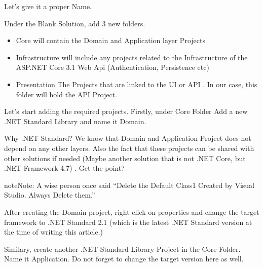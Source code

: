 \documentclass[letterpaper,10pt,english]{sphinxmanual}
\begin{document}
\noindent{}

Let’s give it a proper Name.

\noindent{}

Under the Blank Solution, add 3 new folders.
\begin{itemize}
\item {} 
Core \textendash{} will contain the Domain and Application layer Projects

\item {} 
Infrastructure \textendash{} will include any projects related to the Infrastructure of the ASP.NET Core 3.1 Web Api (Authentication, Persistence etc)

\item {} 
Presentation \textendash{} The Projects that are linked to the UI or API . In our case, this folder will hold the API Project.

\end{itemize}

\noindent{}

Let’s start adding the required projects. Firstly, under Core Folder Add a new .NET Standard Library and name it Domain.

Why .NET Standard? We know that Domain and Application Project does not depend on any other layers. Also the fact that these projects can be shared with other solutions if needed (Maybe another solution that is not .NET Core, but .NET Framework 4.7) . Get the point?

\noindent{}

\begin{sphinxadmonition}{note}{Note:}
A wise person once said \textendash{} “Delete the Default Class1 Created by Visual Studio. Always Delete them.”
\end{sphinxadmonition}

After creating the Domain project, right click on properties and change the target framework to .NET Standard 2.1 (which is the latest .NET Standard version at the time of writing this article.)

\noindent{}

Similary, create another .NET Standard Library Project in the Core Folder. Name it Application. Do not forget to change the target version here as well.
\end{document}
